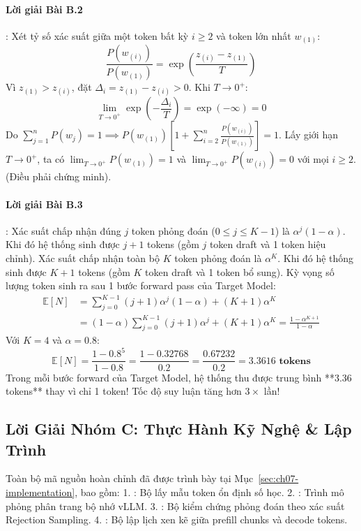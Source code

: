 \paragraph{Lời giải Bài B.2}:
Xét tỷ số xác suất giữa một token bất kỳ $i \ge 2$ và token lớn nhất $w_{(1)}$:
\begin{equation*}
\frac{P(w_{(i)})}{P(w_{(1)})} = \exp\left(\frac{z_{(i)} - z_{(1)}}{T}\right)
\end{equation*}
Vì $z_{(1)} > z_{(i)}$, đặt $\Delta_i = z_{(1)} - z_{(i)} > 0$. Khi $T \to 0^+$:
\begin{equation*}
\lim_{T \to 0^+} \exp\left(-\frac{\Delta_i}{T}\right) = \exp(-\infty) = 0
\end{equation*}
Do $\sum_{j=1}^n P(w_j) = 1 \implies P(w_{(1)}) \left[ 1 + \sum_{i=2}^n \frac{P(w_{(i)})}{P(w_{(1)})} \right] = 1$.
Lấy giới hạn $T \to 0^+$, ta có $\lim_{T \to 0^+} P(w_{(1)}) = 1$ và $\lim_{T \to 0^+} P(w_{(i)}) = 0$ với mọi $i \ge 2$. (Điều phải chứng minh).

\paragraph{Lời giải Bài B.3}:
Xác suất chấp nhận đúng $j$ token phỏng đoán ($0 \le j \le K-1$) là $\alpha^j (1 - \alpha)$. Khi đó hệ thống sinh được $j + 1$ tokens (gồm $j$ token draft và 1 token hiệu chỉnh).
Xác suất chấp nhận toàn bộ $K$ token phỏng đoán là $\alpha^K$. Khi đó hệ thống sinh được $K + 1$ tokens (gồm $K$ token draft và 1 token bổ sung).
Kỳ vọng số lượng token sinh ra sau 1 bước forward pass của Target Model:
\begin{align*}
\mathbb{E}[N] &= \sum_{j=0}^{K-1} (j + 1) \alpha^j (1 - \alpha) + (K + 1) \alpha^K \\
&= (1 - \alpha) \sum_{j=0}^{K-1} (j + 1) \alpha^j + (K + 1) \alpha^K = \frac{1 - \alpha^{K+1}}{1 - \alpha}
\end{align*}
Với $K = 4$ và $\alpha = 0.8$:
\begin{equation*}
\mathbb{E}[N] = \frac{1 - 0.8^5}{1 - 0.8} = \frac{1 - 0.32768}{0.2} = \frac{0.67232}{0.2} = \mathbf{3.3616\text{ tokens}}
\end{equation*}
Trong mỗi bước forward của Target Model, hệ thống thu được trung bình **3.36 tokens** thay vì chỉ 1 token! Tốc độ suy luận tăng hơn $3\times$ lần!

\subsection{Lời Giải Nhóm C: Thực Hành Kỹ Nghệ \& Lập Trình}
Toàn bộ mã nguồn hoàn chỉnh đã được trình bày tại Mục~\ref{sec:ch07-implementation}, bao gồm:
1. : Bộ lấy mẫu token ổn định số học.
2. : Trình mô phỏng phân trang bộ nhớ vLLM.
3. : Bộ kiểm chứng phỏng đoán theo xác suất Rejection Sampling.
4. : Bộ lập lịch xen kẽ giữa prefill chunks và decode tokens.

